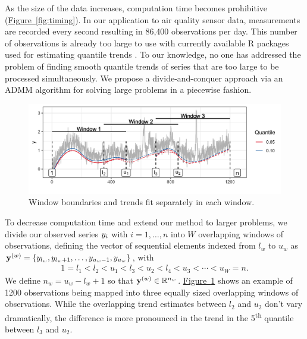 \documentclass[aoas]{imsart}
\newcommand{\Fig}[1]{\hyperref[fig:#1]{Figure~\ref*{fig:#1}}} %
\newcommand{\Fig}[1]{{Figure~\ref{fig:#1}}} %
\newcommand{\Real}{\mathbb{R}}
\newcommand{\V}[1]{{\bm{\mathbf{\MakeLowercase{#1}}}}} %
\newcommand{\VE}[2]{\MakeLowercase{#1}_{#2}} %
\newcommand{\Vn}[2]{\V{#1}^{(#2)}} %
\begin{document}
 As the size of the data increases, computation time becomes prohibitive (\Fig{timing}). In our application to air quality sensor data, measurements are recorded every second resulting in 86,400 observations per day. This number of observations is already too large to use with currently available R packages used for estimating quantile trends \citep{fields, quantreg}. To our knowledge, no one has addressed the problem of finding smooth quantile trends of series that are too large to be processed simultaneously. We propose a divide-and-conquer approach via an ADMM algorithm for solving large problems in a piecewise fashion. 
 
 \begin{figure}[!t]
 	\centering
 	\includegraphics[width = 0.8\linewidth]{Figures/overlapping_windows.png}
 	\caption{Window boundaries and trends fit separately in each window.}
 	\label{fig:windows}
 \end{figure}
 
 To decrease computation time and extend our method to larger problems, we divide our observed series $\VE{y}{i}$ with $i = 1, \ldots, n$ into $W$ overlapping windows of observations, defining the vector of sequential elements indexed from $l_w$ to $u_w$ as $\Vn{y}{w} = \{y_{l_w}, y_{l_w + 1}, \ldots, y_{u_w -1}, y_{u_w}\}$, with 
 \begin{eqnarray*}
 	1 = l_{1} < l_{2} < u_{1} < l_{3} < u_{2} < l_{4} < u_{3} < \cdots < u_{W} = n.
 \end{eqnarray*}
 We define $n_w = u_w-l_w+1$ so that $\Vn{y}{w} \in \Real^{n_w}$. \Fig{windows} shows an example of 1200 observations being mapped into three equally sized overlapping windows of observations. While the overlapping trend estimates between $l_2$ and $u_2$ don't vary dramatically, the difference is more pronounced in the trend in the 5\textsuperscript{th} quantile between $l_3$ and $u_2$. 
 
\end{document}
